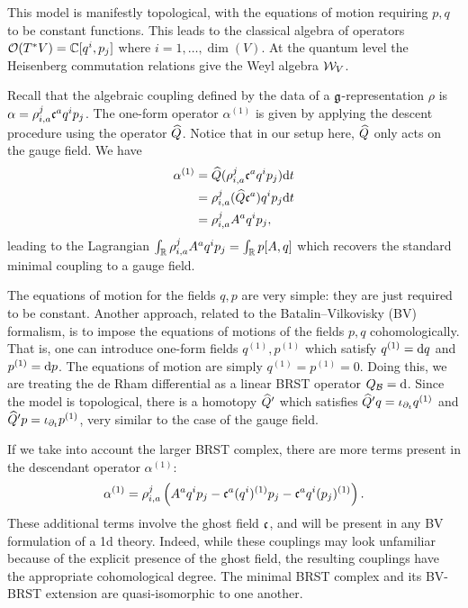 \documentclass[11pt]{amsart}
\begin{document}
This model is manifestly topological, with the equations of motion requiring $p,q$ to be constant functions.
This leads to the classical algebra of operators $\cO(T^* V) = \CC[q^i, p_j]$ where $i=1,\ldots, \dim (V)$. 
At the quantum level the Heisenberg commutation relations give the Weyl algebra $\cW_V$. 
 
Recall that the algebraic coupling defined by the data of a $\fg$-representation $\rho$ is $\alpha = \rho_{i,a}^j \fc^a q^i p_j$.
The one-form operator $\alpha^{(1)}$ is given by applying the descent procedure using the operator $\Hat{Q}$. 
Notice that in our setup here, $\Hat{Q}$ only acts on the gauge field.
We have
\begin{align*}
\alpha^{(1)} & = \Hat{Q} (\rho_{i,a}^j \fc^a q^i p_j) \d t  \\
& = \rho_{i,a}^j (\Hat{Q} \fc^a) q^i p_j \d t \\
& = \rho_{i,a}^j A^a q^i p_j ,
\end{align*}
leading to the Lagrangian $\int_{\RR} \rho_{i,a}^j A^a q^i p_j = \int_\RR p [A,q]$ which recovers the standard minimal coupling to a gauge field. 

The equations of motion for the fields $q,p$ are very simple: they are just required to be constant. 
Another approach, related to the Batalin--Vilkovisky (BV) formalism, is to impose the equations of motions of the fields $p,q$ cohomologically. 
That is, one can introduce one-form fields $q^{(1)}, p^{(1)}$ which satisfy $q^{(1)} = \d q$ and $p^{(1)} = \d p$. 
The equations of motion are simply $q^{(1)} = p^{(1)} = 0$. 
Doing this, we are treating the de Rham differential as a linear BRST operator $Q_{\cB} = \d$. 
Since the model is topological, there is a homotopy $\Hat{Q}'$ which satisfies $\Hat{Q}' q = \iota_{\partial_t} q^{(1)}$ and $\Hat{Q}' p = \iota_{\partial_t} p^{(1)}$, very similar to the case of the gauge field.

If we take into account the larger BRST complex, there are more terms present in the descendant operator $\alpha^{(1)}$:
\[
\alpha^{(1)} = \rho_{i,a}^j \left(A^a q^i p_j - \fc^a (q^i)^{(1)} p_j - \fc^a q^i (p_j)^{(1)}\right) . 
\] 
These additional terms involve the ghost field $\fc$, and will be present in any BV formulation of a 1d theory.  Indeed, while these couplings may look unfamiliar because of the explicit presence of the ghost field, the resulting couplings have the appropriate cohomological degree. The minimal BRST complex and its BV-BRST extension are quasi-isomorphic to one another. 
\end{document}
